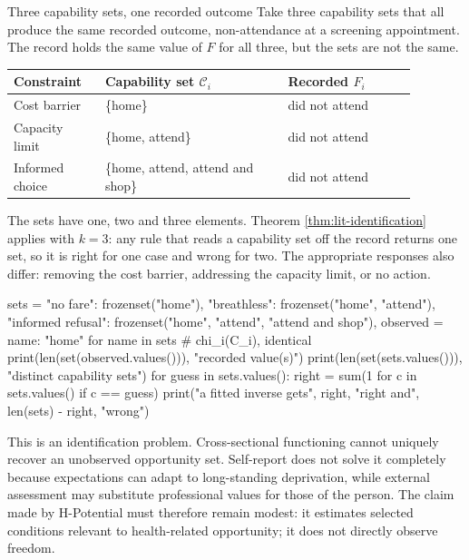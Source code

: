 \begin{workedexample}{Three capability sets, one recorded outcome}
Take three capability sets that all produce the same recorded outcome,
non-attendance at a screening appointment. The record holds the same value of
$F$ for all three, but the sets are not the same.

\begin{center}\small
\begin{tabular}{p{0.20\linewidth}p{0.40\linewidth}p{0.28\linewidth}}
\toprule
Constraint & Capability set $\mathcal C_i$ & Recorded $F_i$ \\
\midrule
Cost barrier & \{home\} & did not attend \\
Capacity limit & \{home, attend\} & did not attend \\
Informed choice & \{home, attend, attend and shop\} & did not attend \\
\bottomrule
\end{tabular}
\end{center}

\noindent The sets have one, two and three elements. Theorem
\ref{thm:lit-identification} applies with $k=3$: any rule that reads a
capability set off the record returns one set, so it is right for one case
and wrong for two. The appropriate responses also differ: removing the cost
barrier, addressing the capacity limit, or no action.

\begin{wecode}[Python]
sets = {
    "no fare":          frozenset({"home"}),
    "breathless":       frozenset({"home", "attend"}),
    "informed refusal": frozenset({"home", "attend", "attend and shop"}),
}
observed = {name: "home" for name in sets}       # chi_i(C_i), identical
print(len(set(observed.values())), "recorded value(s)")
print(len(set(sets.values())), "distinct capability sets")
for guess in sets.values():
    right = sum(1 for c in sets.values() if c == guess)
    print("a fitted inverse gets", right, "right and", len(sets) - right, "wrong")
\end{wecode}

\end{workedexample}

This is an identification problem. Cross-sectional functioning cannot uniquely
recover an unobserved opportunity set. Self-report does not solve it completely
because expectations can adapt to long-standing deprivation, while external
assessment may substitute professional values for those of the person. The
claim made by H-Potential must therefore remain modest: it estimates selected
conditions relevant to health-related opportunity; it does not directly observe
freedom.

